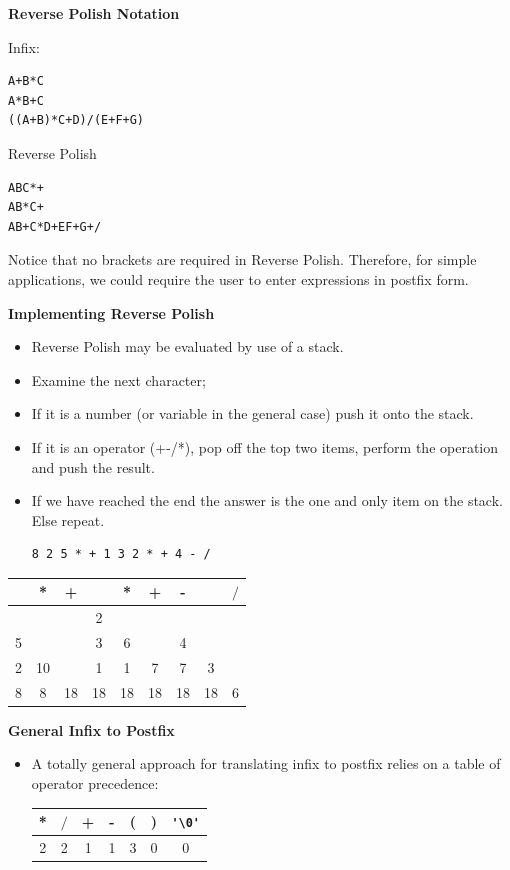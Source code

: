 \newpage
{\samepage
\begin{center}
{\Large{\bf Reverse Polish Notation}}
\end{center}

Infix:
\begin{verbatim}
A+B*C
A*B+C
((A+B)*C+D)/(E+F+G)
\end{verbatim}

Reverse Polish
\begin{verbatim}
ABC*+
AB*C+
AB+C*D+EF+G+/
\end{verbatim}

Notice that no brackets are required in Reverse Polish. Therefore,
for simple applications, we could require the user to enter expressions
in postfix form.
}

\newpage
{\samepage
\begin{center}
{\Large{\bf Implementing Reverse Polish}}
\end{center}
\begin{itemize}
\item Reverse Polish may be evaluated by use of a stack.
\item Examine the next character;
\item If it is a number (or variable in the general case)
push it onto the stack.
\item If it is an operator (+-/*), pop off the top two
items, perform the operation and push the result.
\item If we have reached the end the answer is the one and only
item on the stack. Else repeat.
\begin{verbatim}
8 2 5 * + 1 3 2 * + 4 - /
\end{verbatim}
\end{itemize}

\begin{center}
\begin{tabular}{|c|c|c|c|c|c|c|c|c|}\hline
   & * & + &   & * & + & - &   & $/$ \\ \hline
   &   &   & 2 &   &   &   &   &     \\
 5 &   &   & 3 & 6 &   & 4 &   &     \\
 2 & 10&   & 1 & 1 & 7 & 7 & 3 &     \\
 8 & 8 & 18& 18& 18& 18& 18& 18& 6   \\ \hline
\end{tabular}
\end{center}
}

\newpage
{\samepage
\begin{center}
{\Large{\bf General Infix to Postfix}}
\end{center}
\begin{itemize}
\item A totally general approach for translating infix to postfix relies on
a table of operator precedence:
{\large
\begin{center}
\begin{tabular}{|c|c|c|c|c|c|c|}\hline
*&$/$&+&-&(&)&\verb^'\0'^ \\ \hline
2&2&1&1&3&0&0\\\hline
\end{tabular}
\end{center}
}
\end{itemize}
}

